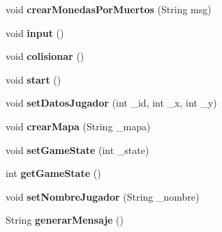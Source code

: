 \begin{DoxyCompactItemize}
\item 
\hypertarget{classBatallaEspacial_1_1Juego_ad83daebeb9d0415474f60b98fe107631}{
void {\bfseries crearMonedasPorMuertos} (String msg)}
\label{classBatallaEspacial_1_1Juego_ad83daebeb9d0415474f60b98fe107631}

\item 
\hypertarget{classBatallaEspacial_1_1Juego_a89aba17b3540c558097299146f1c8c2c}{
void {\bfseries input} ()}
\label{classBatallaEspacial_1_1Juego_a89aba17b3540c558097299146f1c8c2c}

\item 
\hypertarget{classBatallaEspacial_1_1Juego_ab62b36bb44271e26e869868219344263}{
void {\bfseries colisionar} ()}
\label{classBatallaEspacial_1_1Juego_ab62b36bb44271e26e869868219344263}

\item 
\hypertarget{classBatallaEspacial_1_1Juego_a304817b212deb17c27afb95c70efa7fd}{
void {\bfseries start} ()}
\label{classBatallaEspacial_1_1Juego_a304817b212deb17c27afb95c70efa7fd}

\item 
\hypertarget{classBatallaEspacial_1_1Juego_ab7cf6e4ce9ecc48431d372b2e9cc2f51}{
void {\bfseries setDatosJugador} (int \_\-id, int \_\-x, int \_\-y)}
\label{classBatallaEspacial_1_1Juego_ab7cf6e4ce9ecc48431d372b2e9cc2f51}

\item 
\hypertarget{classBatallaEspacial_1_1Juego_afe4506f4253195f0e42dca36a9a16169}{
void {\bfseries crearMapa} (String \_\-mapa)}
\label{classBatallaEspacial_1_1Juego_afe4506f4253195f0e42dca36a9a16169}

\item 
\hypertarget{classBatallaEspacial_1_1Juego_abd8b8ad38e8965be83e9fdceda042cf3}{
void {\bfseries setGameState} (int \_\-state)}
\label{classBatallaEspacial_1_1Juego_abd8b8ad38e8965be83e9fdceda042cf3}

\item 
\hypertarget{classBatallaEspacial_1_1Juego_a0088967edd1b4da56e451f4066c90d8a}{
int {\bfseries getGameState} ()}
\label{classBatallaEspacial_1_1Juego_a0088967edd1b4da56e451f4066c90d8a}

\item 
\hypertarget{classBatallaEspacial_1_1Juego_aa68df7b9fcdf77f36e22fa649d2e504d}{
void {\bfseries setNombreJugador} (String \_\-nombre)}
\label{classBatallaEspacial_1_1Juego_aa68df7b9fcdf77f36e22fa649d2e504d}

\item 
\hypertarget{classBatallaEspacial_1_1Juego_a3117a54416ecf1eb6a58095bf208b656}{
String {\bfseries generarMensaje} ()}
\label{classBatallaEspacial_1_1Juego_a3117a54416ecf1eb6a58095bf208b656}


\end{DoxyCompactItemize}
